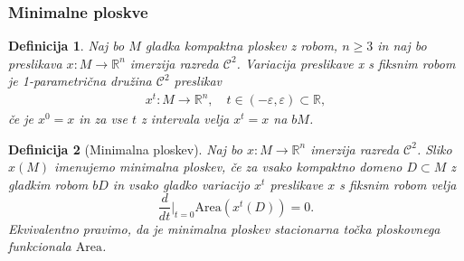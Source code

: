 \documentclass[9pt, table]{beamer}
\newtheorem{definicija}{Definicija}
\newcommand{\R}{\mathbb R}
\begin{document}
\begin{frame}
\frametitle{Minimalne ploskve}

\begin{definicija}
Naj bo $M$ gladka kompaktna ploskev z robom, $n \geq 3$ in naj bo preslikava $x \colon M \to \R^{n}$ imerzija razreda $\mathcal{C}^2$. {\color{blue} Variacija preslikave x s fiksnim robom} je 1-parametrična družina $\mathcal{C}^2$ preslikav 
\begin{gather}
x^{t} \colon M \to \R^{n}, \quad t \in (-\varepsilon, \varepsilon) \subset \R,
\end{gather}
če je $x^0 = x$ in za vse $t$ z intervala velja $x^{t} = x$ na $bM$.
\end{definicija}
\pause

\begin{definicija} [Minimalna ploskev]
Naj bo $x \colon M \to \R^{n}$ imerzija razreda $\mathcal{C}^2$. Sliko $x(M)$ imenujemo {\color{blue} minimalna ploskev}, če za vsako kompaktno domeno $D \subset M$ z gladkim robom $bD$ in vsako gladko variacijo $x^{t}$ preslikave $x$ s fiksnim robom velja
\begin{equation} 
\frac{d}{dt} \Big|_{t=0} \mathrm{Area} \left(x^{t}(D)\right) = 0.
\end{equation}
Ekvivalentno pravimo, da je minimalna ploskev stacionarna točka ploskovnega funkcionala $\mathrm{Area}$.
\end{definicija}

\end{frame}

\end{document}
